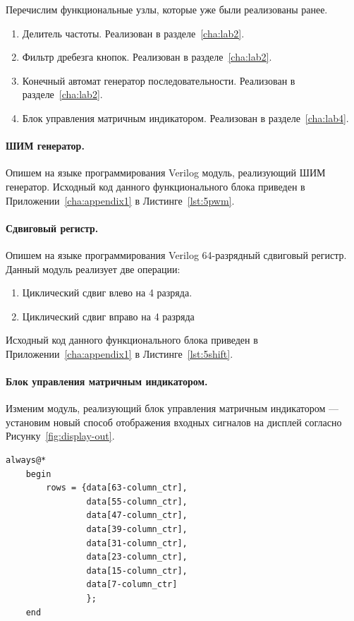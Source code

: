 Перечислим функциональные узлы, которые уже были реализованы ранее. 

\begin{enumerate}
	\item Делитель частоты. Реализован в разделе~\ref{cha:lab2}.
	\item Фильтр дребезга кнопок. Реализован в разделе~\ref{cha:lab2}.
	\item Конечный автомат генератор последовательности. Реализован в разделе~\ref{cha:lab2}.
	\item Блок управления матричным индикатором. Реализован в разделе~\ref{cha:lab4}.
\end{enumerate}

\paragraph{ШИМ генератор.}
Опишем на языке программирования Verilog модуль, реализующий ШИМ генератор. 
Исходный код данного функционального блока приведен в Приложении~\ref{cha:appendix1} в Листинге~\ref{lst:5pwm}.


\paragraph{Сдвиговый регистр.}
Опишем на языке программирования Verilog 64-разрядный сдвиговый регистр. Данный модуль реализует две операции:
\begin{enumerate}
	\item Циклический сдвиг влево на 4 разряда.
	\item Циклический сдвиг вправо на 4 разряда
\end{enumerate}

Исходный код данного функционального блока приведен в Приложении~\ref{cha:appendix1} в Листинге~\ref{lst:5shift}.

\paragraph{Блок управления матричным индикатором.}
Изменим модуль, реализующий блок управления матричным индикатором --- установим новый способ отображения входных сигналов на дисплей согласно Рисунку~\ref{fig:display-out}.

\begin{lstlisting}[caption={Измененный способ коммутации}]
	always@*
	begin
		rows = {data[63-column_ctr],
				data[55-column_ctr],
				data[47-column_ctr],
				data[39-column_ctr],
				data[31-column_ctr],
				data[23-column_ctr],
				data[15-column_ctr],
				data[7-column_ctr]
				};
	end
\end{lstlisting}

